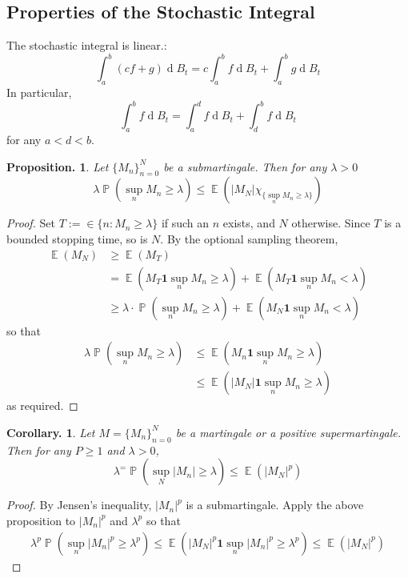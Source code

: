 \documentclass[11pt, a4paper]{memoir}
\theoremstyle{change}
\newtheorem{corollary}[theorem]{Corollary.}
\newtheorem{proposition}[theorem]{Proposition.}
\theoremstyle{plain}
\theoremstyle{nonumberplain}
\newtheorem{proof}{Proof}
\DeclareMathOperator{\pr}{{\mathbb{P}}}
\DeclareMathOperator{\E}{{\mathbb{E}}}
\renewcommand{\d}[1]{\ensuremath{\operatorname{d}\!{#1}}}
\newcommand{\idc}{\mathbf{1}}
\numberwithin{equation}{section}
\begin{document}
\subsection{Properties of the Stochastic Integral}
The stochastic integral is linear.:
\begin{equation*}
    \int_a^b(cf+g)\d{B_t} = c\int_a^b f\d{B_t}+\int_a^b g\d{B_t}
\end{equation*}
In particular,
\begin{equation*}
    \int_a^b f\d{B_t}=\int_a^df\d{B_t}+\int_d^bf\d{B_t}
\end{equation*}
for any $a<d<b$.
\begin{proposition}
    Let $\{M_n\}_{n=0}^N$ be a submartingale.
    Then for any $\lambda>0$
    \begin{equation*}
        \lambda\pr(\sup_n M_n\geq\lambda)\leq\E(|M_N|\chi_{\{\sup_n M_n\geq\lambda\}})
    \end{equation*}
\end{proposition}
\begin{proof}
    Set $T:=\in\{n:M_n\geq\lambda\}$ if such an $n$ exists, and $N$ otherwise.
    Since $T$ is a bounded stopping time, so is $N$.
    By the optional sampling theorem,
    \begin{align*}
        \E(M_N)&\geq\E(M_T)\\
               &= \E(M_T\idc{\sup_n M_n\geq\lambda})+\E(M_T\idc{\sup_n M_n<\lambda})\\
               &\geq \lambda\cdot\pr(\sup_n M_n\geq\lambda)+\E(M_N\idc{\sup_n M_n<\lambda})
    \end{align*}
    so that
    \begin{align*}
        \lambda\pr(\sup_n M_n\geq\lambda) &\leq\E(M_n\idc{\sup_n M_n\geq\lambda})\\
                                          &\leq\E(|M_N|\idc{\sup_n M_n\geq\lambda})
    \end{align*}
    as required.
\end{proof}
\begin{corollary}
    Let $M=\{M_n\}_{n=0}^N$ be a martingale or a positive supermartingale.
    Then for any $P\geq 1$ and $\lambda>0$,
    \begin{equation*}
        \lambda^=\pr(\sup_N|M_n|\geq\lambda)\leq\E(|M_N|^p)
    \end{equation*}
\end{corollary}
\begin{proof}
    By Jensen's inequality, $|M_n|^p$ is a submartingale.
    Apply the above proposition to $|M_n|^p$ and $\lambda^p$ so that
    \begin{align*}
        \lambda^p\pr(\sup_n|M_n|^p\geq\lambda^p)\leq\E(|M_N|^p\idc{\sup_n|M_n|^p\geq\lambda^p})\leq\E(|M_N|^p)
    \end{align*}
\end{proof}
\end{document}
